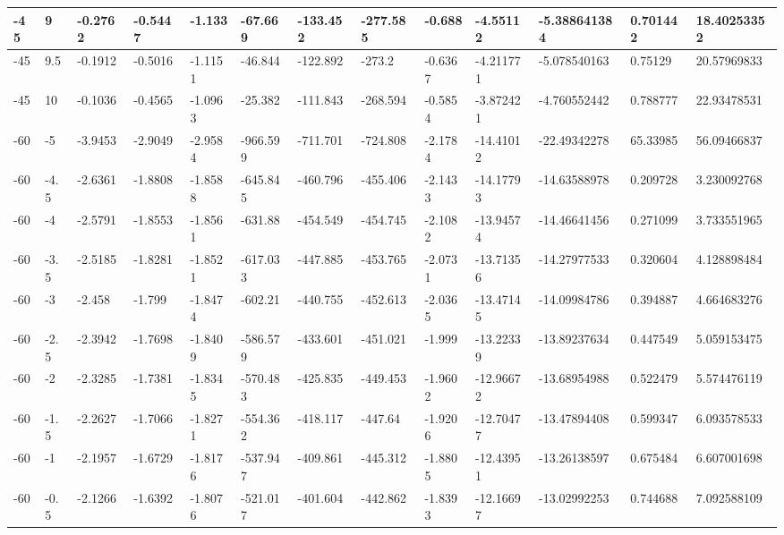 \begin{longtable}{|l|l|l|l|l|l|l|l|l|l|l|l|l|}
-45   & 9     & -0.2762 & -0.5447 & -1.133  & -67.669  & -133.452 & -277.585 & -0.688   & -4.55112    & -5.388641384   & 0.701442                 & 18.40253352 \\ \hline
-45   & 9.5   & -0.1912 & -0.5016 & -1.1151 & -46.844  & -122.892 & -273.2   & -0.6367  & -4.211771   & -5.078540163   & 0.75129                  & 20.57969833 \\ \hline
-45   & 10    & -0.1036 & -0.4565 & -1.0963 & -25.382  & -111.843 & -268.594 & -0.5854  & -3.872421   & -4.760552442   & 0.788777                 & 22.93478531 \\ \hline
-60   & -5    & -3.9453 & -2.9049 & -2.9584 & -966.599 & -711.701 & -724.808 & -2.1784  & -14.41012   & -22.49342278   & 65.33985                 & 56.09466837 \\ \hline
-60   & -4.5  & -2.6361 & -1.8808 & -1.8588 & -645.845 & -460.796 & -455.406 & -2.1433  & -14.17793   & -14.63588978   & 0.209728                 & 3.230092768 \\ \hline
-60   & -4    & -2.5791 & -1.8553 & -1.8561 & -631.88  & -454.549 & -454.745 & -2.1082  & -13.94574   & -14.46641456   & 0.271099                 & 3.733551965 \\ \hline
-60   & -3.5  & -2.5185 & -1.8281 & -1.8521 & -617.033 & -447.885 & -453.765 & -2.0731  & -13.71356   & -14.27977533   & 0.320604                 & 4.128898484 \\ \hline
-60   & -3    & -2.458  & -1.799  & -1.8474 & -602.21  & -440.755 & -452.613 & -2.0365  & -13.47145   & -14.09984786   & 0.394887                 & 4.664683276 \\ \hline
-60   & -2.5  & -2.3942 & -1.7698 & -1.8409 & -586.579 & -433.601 & -451.021 & -1.999   & -13.22339   & -13.89237634   & 0.447549                 & 5.059153475 \\ \hline
-60   & -2    & -2.3285 & -1.7381 & -1.8345 & -570.483 & -425.835 & -449.453 & -1.9602  & -12.96672   & -13.68954988   & 0.522479                 & 5.574476119 \\ \hline
-60   & -1.5  & -2.2627 & -1.7066 & -1.8271 & -554.362 & -418.117 & -447.64  & -1.9206  & -12.70477   & -13.47894408   & 0.599347                 & 6.093578533 \\ \hline
-60   & -1    & -2.1957 & -1.6729 & -1.8176 & -537.947 & -409.861 & -445.312 & -1.8805  & -12.43951   & -13.26138597   & 0.675484                 & 6.607001698 \\ \hline
-60   & -0.5  & -2.1266 & -1.6392 & -1.8076 & -521.017 & -401.604 & -442.862 & -1.8393  & -12.16697   & -13.02992253   & 0.744688                 & 7.092588109 \\ \hline

\end{longtable}
